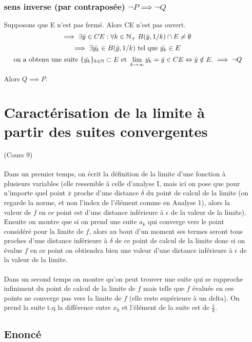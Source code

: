 \documentclass{article}
\begin{document}
\subsubsection{sens inverse (par contraposée) $ \neg P \implies \neg Q $}

Supposons que E n'est pas fermé. Alors CE n'est pas ouvert.
\[ \implies \exists \Bar{y} \in CE : \forall k \in \mathbb{N_+}\ B(\Bar{y}, 1/k) \cap E \neq \emptyset \]
\[ \implies \exists \Bar{y_k} \in B(\Bar{y}, 1/k) \text{ tel que } \Bar{y_k} \in E \]
\[ \text{ on a obtenu une suite } \{ \Bar{y_k} \}_{k \in \mathbb{N}} \subset E \text{ et } \lim_{k\to\infty} \Bar{y_k} = \Bar{y} \in CE \Leftrightarrow \Bar{y} \notin E. \implies \neg{Q} \]

Alors $ Q \implies P $.

\newpage

\section{Caractérisation de la limite à partir des suites convergentes}

(Cours 9)\\\\
Dans un premier temps, on écrit la définition de la limite d'une fonction à plusieurs variables (elle ressemble à celle d'analyse I, mais ici on pose que pour n'importe quel point $\overline{x}$ proche d'une distance $\delta$ du point de calcul de la limite (on regarde la norme, et non l'index de l'élément comme en Analyse 1), alors la valeur de $f$ en ce point est d'une distance inférieure à $\epsilon$ de la valeur de la limite).\\
Ensuite on montre que si on prend une suite $a_k$ qui converge vers le point considéré pour la limite de $f$, alors au bout d'un moment ses termes seront tous proches d'une distance inférieure à $\delta$ de ce point de calcul de la limite donc si on évalue $f$ en ce point on obtiendra bien une valeur d'une distance inférieure à $\epsilon$ de la valeur de la limite.\\\\
Dans un second temps on montre qu'on peut trouver une suite qui se rapproche infiniment du point de calcul de la limite de $f$ mais telle que $f$ évaluée en ces points ne converge pas vers la limite de $f$ (elle reste supérieure à un delta). On prend la suite t.q la différence entre $x_0$ et l'élément de la suite est de $\frac{1}{k}$. 

\subsection{Enoncé}
\end{document}
